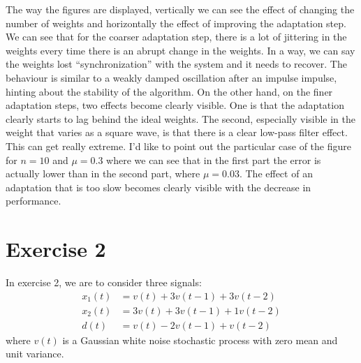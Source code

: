 The way the figures are displayed, vertically we can see the effect of changing
the number of weights and horizontally the effect of improving the adaptation
step. We can see that for the coarser adaptation step, there is a lot of jittering
in the weights every time there is an abrupt change in the weights. In a way, we
can say the weights lost ``synchronization'' with the system and it needs to
recover. The behaviour is similar to a weakly damped oscillation after an impulse
impulse, hinting about the stability of the algorithm. On the other hand, on the
finer adaptation steps, two effects become clearly visible. One is that the
adaptation clearly starts to lag behind the ideal weights. The second, especially
visible in the weight that varies as a square wave, is that there is a clear
low-pass filter effect. This can get really extreme. I'd like to point out the
particular case of the figure~\label{fig:ex1vsig3n10mu3} for \(n=10\) and
\(\mu=0.3\) where we can see that in the first part the error is actually lower
than in the second part, where \(\mu=0.03\). The effect of an adaptation that is
too slow becomes clearly visible with the decrease in performance.

\FloatBarrier
\section{Exercise 2}

In exercise 2, we are to consider three signals:
\begin{align}
    x_1 (t) & = v(t) + 3v(t-1) + 3v(t-2)  \\
    x_2 (t) & = 3v(t) + 3v(t-1) + 1v(t-2) \\
    d(t)    & = v(t) - 2v(t-1) + v(t-2)
\end{align}
where \(v(t)\) is a Gaussian white noise stochastic process with zero mean and
unit variance.

